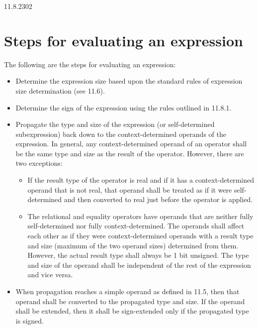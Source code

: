 \documentclass{article}
\begin{document}
\begin{lrmquote}{11.8.2}{302}
  {
    \color{red}

    \section{Steps for evaluating an expression}

    The following are the steps for evaluating an expression:
    \begin{itemize}
      \item Determine the expression size based upon the standard rules of
        expression size determination (see 11.6).
      \item Determine the sign of the expression using the rules outlined in
        11.8.1.
      \item Propagate the type and size of the expression (or self-determined
        subexpression) back down to the context-determined operands of the
        expression. In general, any context-determined operand of an operator
        shall be the same type and size as the result of the operator.
        However, there are two exceptions:
        \begin{itemize}
          \item If the result type of the operator is real and if it has a
            context-determined operand that is not real, that operand
            shall be treated as if it were self-determined and then
            converted to real just before the operator is applied.
          \item The relational and equality operators have operands that are
            neither fully self-determined nor fully context-determined. The
            operands shall affect each other as if they were context-determined
            operands with a result type and size (maximum of the two operand
            sizes) determined from them. However, the actual result type shall
            always be 1 bit unsigned. The type and size of the operand shall be
            independent of the rest of the expression and vice versa.
        \end{itemize}
      \item When propagation reaches a simple operand as defined in 11.5, then
        that operand shall be converted to the propagated type and size. If the
        operand shall be extended, then it shall be sign-extended only if the
        propagated type is signed.
    \end{itemize}
  }
\end{lrmquote}
\end{document}
